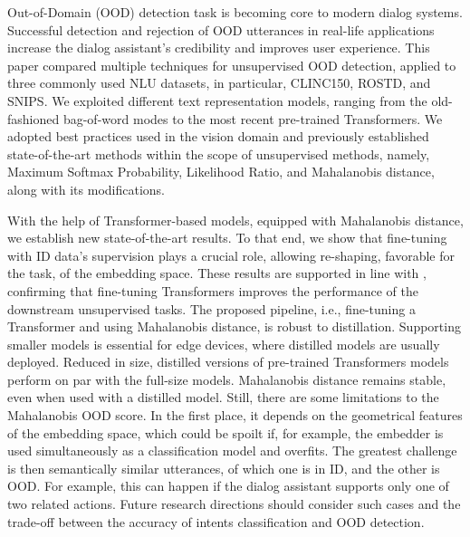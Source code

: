 \documentclass[letterpaper, final]{article} %
\begin{document}
Out-of-Domain (OOD) detection task is becoming core to modern dialog systems. Successful detection and rejection of OOD utterances in real-life applications increase the dialog assistant's credibility and improves user experience. This paper compared multiple techniques for unsupervised OOD detection, applied to three commonly used NLU datasets, in particular, CLINC150, ROSTD, and SNIPS. We exploited different text representation models, ranging from the old-fashioned bag-of-word modes to the most recent pre-trained Transformers. We adopted best practices used in the vision domain and previously established state-of-the-art methods within the scope of unsupervised methods, namely, Maximum Softmax Probability, Likelihood Ratio, and Mahalanobis distance, along with its modifications.

With the help of Transformer-based models, equipped with Mahalanobis distance, we establish new state-of-the-art results. To that end, we show that fine-tuning with ID data's supervision plays a crucial role, allowing re-shaping, favorable for the task, of the embedding space. These results are supported in line with \cite{reimers2019sentence}, confirming that fine-tuning Transformers improves the performance of the downstream unsupervised tasks. The proposed pipeline, i.e., fine-tuning a Transformer and using Mahalanobis distance, is robust to distillation. Supporting smaller models is essential for edge devices, where distilled models are usually deployed. Reduced in size, distilled versions of pre-trained Transformers models perform on par with the full-size models. Mahalanobis distance remains stable, even when used with a distilled model.  Still, there are some limitations to the Mahalanobis OOD score. In the first place, it depends on the geometrical features of the embedding space, which could be spoilt if, for example, the embedder is used simultaneously as a classification model and overfits. The greatest challenge is then semantically similar utterances, of which one is in ID, and the other is OOD. For example, this can happen if the dialog assistant supports only one of two related actions. Future research directions should consider such cases and the trade-off between the accuracy of intents classification and OOD detection.


\vspace{-3.15mm}
\end{document}
